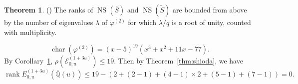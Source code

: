 \documentclass[a4paper]{jarticle} %
\theoremstyle{definition}
\newtheorem{thm}{Theorem}[section]
\theoremstyle{remark}
\DeclareMathOperator{\rank}{rank}
\DeclareMathOperator{\NS}{NS}
\DeclareMathOperator{\chara}{char}
\begin{document}
\begin{thm}{(\cite[Corollary 6.4.]{ref:vanluijk2007})}
    \label{cor:ns_upper_bound}
    The ranks of $\NS (\overline{S})$ and $\NS (\tilde{S})$ are bounded from above by the number of eigenvalues $\lambda$ of $\varphi^{(2)}$ for which $\lambda/q$ is a root of unity, counted with multiplicity.
\end{thm}

\begin{equation*}
    \chara(\varphi^{(2)}) = (x-5)^{19}(x^{3} + x^{2} + 11 x - 77).
\end{equation*}
By Corollary~\ref{cor:ns_upper_bound}, $\rho(\mathcal{E}_{0,u}^{(1 + 3u)}) \leq 19$.
Then by Theorem~\ref{thm:shioda}, we have
\begin{equation*}
    \rank E_{0,u}^{(1 + 3u)}(\overline{\mathbb{Q}}(u)) \leq 19 - (2 + (2 - 1) + (4 - 1) \times 2 + (5 - 1) + (7 - 1)) = 0.
\end{equation*}

    
\printbibliography
\end{document}
